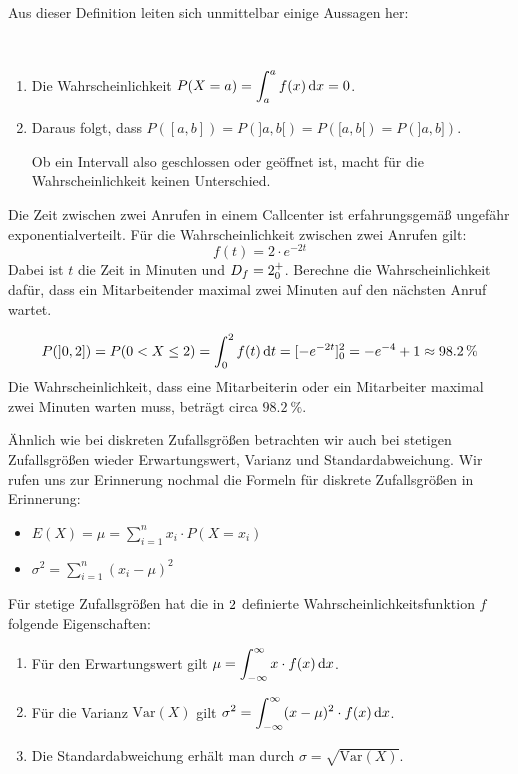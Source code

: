 \documentclass[ngerman, 12pt]{nssheetxea}
\begin{document}
Aus dieser Definition leiten sich unmittelbar einige Aussagen her:

\begin{theorem} \ 
\begin{enumerate}
\item Die Wahrscheinlichkeit $\displaystyle P(X=a)=\int_a^a f(x) \mathop{}\!\mathrm{d} x = 0$.
\item Daraus folgt, dass $P([a,b])=P(]a,b[)=P([a,b[)=P(]a,b])$. \par Ob ein Intervall also geschlossen oder geöffnet ist, macht für die Wahrscheinlichkeit keinen Unterschied.
\end{enumerate}
\end{theorem}

\begin{example}
Die Zeit zwischen zwei Anrufen in einem Callcenter ist erfahrungsgemäß ungefähr exponentialverteilt. Für die Wahrscheinlichkeit zwischen zwei Anrufen gilt:
\[ f(t)=2\cdot e^{-2t}\]
Dabei ist $t$ die Zeit in Minuten und $D_f=2^+_0$. Berechne die Wahrscheinlichkeit dafür, dass ein Mitarbeitender maximal zwei Minuten auf den nächsten Anruf wartet. \par
\[ P(]0,2])=P(0<X\leq 2) = \int_0^2 f(t) \mathop{}\!\mathrm{d} t = [-e^{-2t}]_0^2 = -e^{-4} + 1 \approx \SI{98,2}{\percent} \]
Die Wahrscheinlichkeit, dass eine Mitarbeiterin oder ein Mitarbeiter maximal zwei Minuten warten muss, beträgt circa $\SI{98,2}{\percent}$.
\label{Bsp:Callcenter}
\end{example}

Ähnlich wie bei diskreten Zufallsgrößen betrachten wir auch bei stetigen Zufallsgrößen wieder Erwartungswert, Varianz und Standardabweichung. Wir rufen uns zur Erinnerung nochmal die Formeln für diskrete Zufallsgrößen in Erinnerung:
\begin{itemize}
\item $\displaystyle E(X)=\mu = \sum_{i=1}^n x_i \cdot P(X=x_i)  $
\item $\displaystyle \sigma^2 = \sum_{i=1}^n (x_i-\mu)^2 $
\end{itemize}

\begin{definition}
Für stetige Zufallsgrößen hat die in $2$ definierte Wahrscheinlichkeitsfunktion $f$ folgende Eigenschaften:
\begin{enumerate}
\item Für den Erwartungswert gilt $\displaystyle \mu = \int_{-\infty}^{\infty}x \cdot f(x) \mathop{}\!\mathrm{d} x$.
\item Für die Varianz $\mathrm{Var}(X)$ gilt $\displaystyle \sigma^2 = \int_{-\infty}^{\infty} (x-\mu)^2 \cdot f(x) \mathop{}\!\mathrm{d} x$.
\item Die Standardabweichung erhält man durch $\sigma = \sqrt{\mathrm{Var}(X)}$.
\end{enumerate}
\end{definition}
\end{document}
